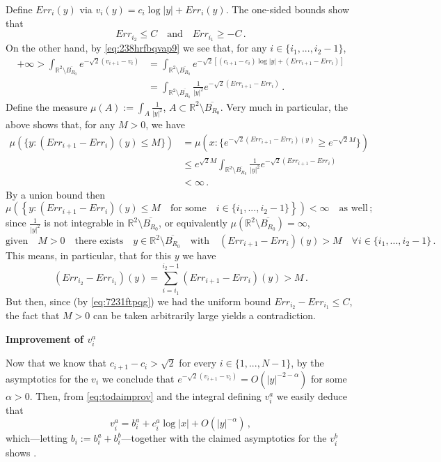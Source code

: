\documentclass{article}
\newcommand{\R}{\mathbb{R}}
\theoremstyle{definition}
\begin{document}
Define $Err_i(y)$ via $v_i(y)=c_i\log|y|+Err_i(y)$. The one-sided bounds show that
\begin{equation}\label{eq:7231ftpqg}
    Err_{i_2}\leq C\quad\mbox{and}\quad Err_{i_1}\geq -C\,.
\end{equation}
On the other hand, by \eqref{eq:238hrfbqvap9} we see that, for any $i\in\{i_1,...,i_2-1\}$,
\begin{align*}
    +\infty>\int_{\R^2\setminus \overline{B_{R_0}}}e^{-\sqrt{2}(v_{i+1}-v_{i})}&=\int_{\R^2\setminus \overline{B_{R_0}}}e^{-\sqrt{2}\left[(c_{i+1}-c_{i})\log|y|+(Err_{i+1}-Err_{i})\right]}\\
    &=\int_{\R^2\setminus \overline{B_{R_0}}}\frac{1}{|y|^2}e^{-\sqrt{2}(Err_{i+1}-Err_{i})}\,.
\end{align*}
Define the measure $\mu(A):=\int_{A}\frac{1}{|y|^2}$, $A\subset \R^2\setminus \overline{B_{R_0}}$. Very much in particular, the above shows that, for any $M>0$, we have
\begin{align*}
    \mu(\{y:(Err_{i+1}-Err_{i})(y)\leq M\})&=\mu(x:\{e^{-\sqrt{2}(Err_{i+1}-Err_{i})(y)}\geq  e^{-\sqrt{2}M}\})\\
    &\leq e^{\sqrt{2}M}\int_{\R^2\setminus \overline{B_{R_0}}}\frac{1}{|y|^2}e^{-\sqrt{2}(Err_{i+1}-Err_{i})}\\
    &<\infty\,.
\end{align*}
By a union bound then
$$\mu\left(\left\{y:(Err_{i+1}-Err_{i})(y)\leq M\quad \mbox{for some}\quad i\in\{i_1,...,i_2-1\}\right\}\right)<\infty\quad\mbox{as well}\,;$$
since $\frac{1}{|y|^2}$ is not integrable in $\R^2\setminus \overline{B_{R_0}}$, or equivalently $\mu(\R^2\setminus \overline{B_{R_0}})=\infty$,
$$\mbox{given}\quad M>0\quad\mbox{there exists}\quad y\in \R^2\setminus \overline{B_{R_0}}\quad\mbox{with}\quad (Err_{i+1}-Err_{i})(y)> M \quad \forall i\in\{i_1,...,i_2-1\}\,.$$
This means, in particular, that for this $y$ we have
$$(Err_{i_2}-Err_{i_1})(y)=\sum_{i=i_1}^{i_2-1}(Err_{i+1}-Err_{i})(y)> M\,.$$
But then, since (by \eqref{eq:7231ftpqg}) we had the uniform bound $Err_{i_2}-Err_{i_1}\leq C$, the fact that $M>0$ can be taken arbitrarily large yields a contradiction.

{\bf Improvement of $v_i^a$}

Now that we know that $c_{i+1}-c_i> \sqrt{2}$ for every $i\in\{1,...,N-1\}$, by the asymptotics for the $v_i$ we conclude that $e^{-\sqrt{2}(v_{i+1}-v_i)}=O(|y|^{-2-\alpha})$ for some $\alpha>0$. Then, from \eqref{eq:todaimprov} and the integral defining $v_i^a$ we easily deduce that
$$v_i^a=b_i^a+c_i^a\log|x|+O(|y|^{-\alpha})\,,$$
which---letting $b_i:=b_i^a+b_i^b$---together with the claimed asymptotics for the $v_i^b$ shows .
\end{document}

